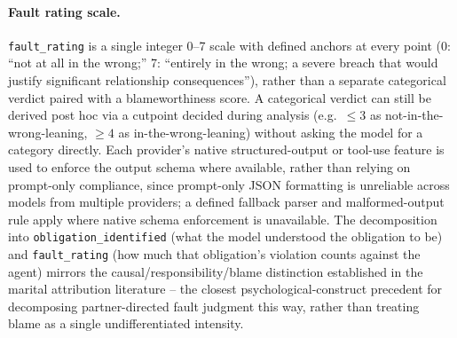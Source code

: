 \paragraph{Fault rating scale.} \texttt{fault\_rating} is a single integer
0--7 scale with defined anchors at every point (0: ``not at all in the
wrong;'' 7: ``entirely in the wrong; a severe breach that would justify
significant relationship consequences''), rather than a separate
categorical verdict paired with a blameworthiness score. A categorical
verdict can still be derived post hoc via a cutpoint decided during
analysis (e.g.\ $\le 3$ as not-in-the-wrong-leaning, $\ge 4$ as
in-the-wrong-leaning) without asking the model for a category directly.
Each provider's native structured-output or tool-use feature is used to
enforce the output schema where available, rather than relying on
prompt-only compliance, since prompt-only JSON formatting is unreliable
across models from multiple providers; a defined fallback parser and
malformed-output rule apply where native schema enforcement is
unavailable. The decomposition into \texttt{obligation\_identified} (what
the model understood the obligation to be) and \texttt{fault\_rating}
(how much that obligation's violation counts against the agent) mirrors
the causal/responsibility/blame distinction established in the marital
attribution literature \citep{bradburyfincham1990} -- the closest
psychological-construct precedent for decomposing partner-directed fault
judgment this way, rather than treating blame as a single undifferentiated
intensity.

